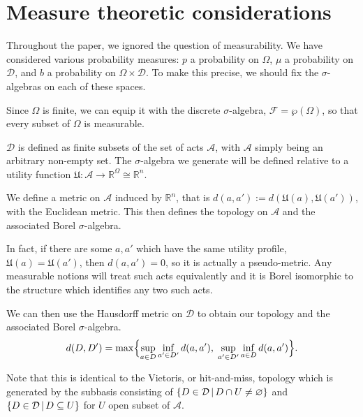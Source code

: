 \documentclass[a4paper]{article}
\newcommand\A{\mathcal{A}}
\newcommand\U{\mathfrak{U}} %
\newcommand{\Decs}{\mathcal{D}}
\renewcommand{\Re}{\mathbb{R}}
\renewcommand{\color}[1]{}
\newenvironment{colored}[1]{\leavevmode\color{#1}}{}
\newcommand\SetDelimiter[1][]{
	\nonscript\,#1\vert \allowbreak \nonscript\,\mathopen{}}
\providecommand\given{\SetDelimiter}
\renewcommand{\emptyset}{\varnothing}
\newenvironment{CCM rewritten}
{\begingroup\color{blue}} %
{\endgroup}              %
\begin{document}
\begin{colored}{violet}
	

	
	\section{Measure theoretic considerations}\label{sect:appendix:measure}
	Throughout the paper, we ignored the question of measurability. We have considered various probability measures: $p$ a probability on $\Omega$, $\mu$ a probability on $\Decs$, and $b$ a probability on $\Omega\times\Decs$. To make this precise, we should fix the $\sigma$-algebras on each of these spaces.
	
	Since $\Omega$ is finite, we can equip it with the discrete $\sigma$-algebra, $\mathcal{F}=\wp(\Omega)$, so that every subset of $\Omega$ is measurable. 	
	
	$\Decs$ is defined as finite subsets of the set of acts $\A$, with $\A$ simply being an arbitrary non-empty set. 
	The $\sigma$-algebra we generate will be defined relative to a utility function $\U:\A\to\Re^\Omega\cong\Re^n$. 
	
	We define a metric on $\A$ induced by $\Re^n$, that is $d(a,a'):=d(\U(a),\U(a'))$, with the Euclidean metric. 
	This then defines the topology on $\A$ and the associated Borel $\sigma$-algebra. 
	
	In fact, if there are some $a,a'$ which have the same utility profile, $\U(a)=\U(a')$, then $d(a,a')=0$, so it is actually a pseudo-metric. Any measurable notions will treat such acts equivalently and it is Borel isomorphic to the structure which identifies any two such acts.
	
	We can then use the Hausdorff metric on $\Decs$ to obtain our topology and the associated Borel $\sigma$-algebra.
	  \[
	d(D, D') = \max\Bigl\{
	\sup_{a \in D}\inf_{a' \in D'}d(a,a'),
	\;\sup_{a' \in D'}\inf_{a \in D}d(a,a')
	\Bigr\}.
	\]
	
	
	\begin{colored}{red}
		Note that this is identical to the Vietoris, or hit-and-miss, topology which is generated by the subbasis consisting of $\{D\in \Decs\given D\cap U\neq \emptyset\}$ and $\{D \in\Decs\given D\subseteq U\}$ for $U$ open subset of $\A$. 
	\end{colored}
	

	


\end{colored}
\end{document}
